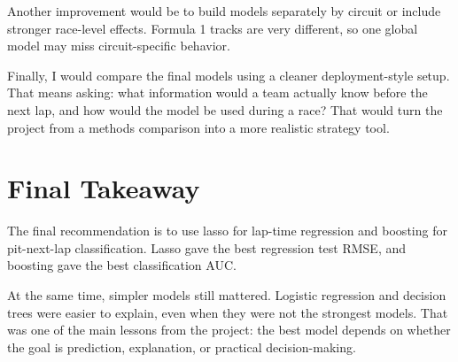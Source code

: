 \documentclass[11pt,oneside,openany]{book}
\begin{document}
Another improvement would be to build models separately by circuit or include stronger race-level effects. Formula 1 tracks are very different, so one global model may miss circuit-specific behavior.

Finally, I would compare the final models using a cleaner deployment-style setup. That means asking: what information would a team actually know before the next lap, and how would the model be used during a race? That would turn the project from a methods comparison into a more realistic strategy tool.

\section{Final Takeaway}

The final recommendation is to use lasso for lap-time regression and boosting for pit-next-lap classification. Lasso gave the best regression test RMSE, and boosting gave the best classification AUC.

At the same time, simpler models still mattered. Logistic regression and decision trees were easier to explain, even when they were not the strongest models. That was one of the main lessons from the project: the best model depends on whether the goal is prediction, explanation, or practical decision-making.

\backmatter
\renewcommand{\bibname}{References}
\nocite{islr2}


\end{document}
